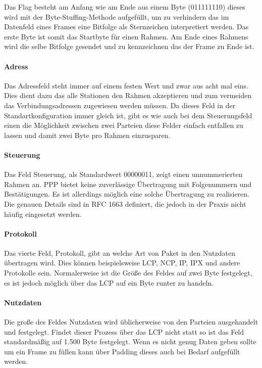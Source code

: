 \documentclass[12pt, a4paper, ngerman]{article}
\begin{document}
Das Flag besteht am Anfang wie am Ende aus einem Byte (011111110) dieses wird mit der Byte-Stuffing-Methode aufgefüllt, um zu verhindern das im Datenfeld eines Frames eine Bitfolge als Sternzeichen interpretiert werden. Das erste Byte ist somit das Startbyte für einen Rahmen. Am Ende eines Rahmens wird die selbe Bitfolge gesendet und zu kennzeichnen das der Frame zu Ende ist.


\paragraph{Adress}

Das Adressfeld steht immer auf einem festen Wert und zwar aus acht mal eins. Dies dient dazu das alle Stationen den Rahmen akzeptieren und zum vermeiden das Verbindungsadressen zugewiesen werden müssen. Da dieses Feld in der Standartkonfiguration immer gleich ist, gibt es wie auch bei dem Steuerungsfeld einen die Möglichkeit zwischen zwei Parteien diese Felder einfach entfallen zu lassen und damit zwei Byte pro Rahmen einzusparen.


\paragraph{Steuerung}

Das Feld Steuerung, als Standardwert 00000011, zeigt einen unnummerierten Rahmen an. PPP bietet keine zuverlässige Übertragung mit Folgenummern und Bestätigungen. Es ist allerdings möglich eine solche Übertragung zu realisieren. Die genauen Details sind in RFC 1663 definiert, die jedoch in der Praxis nicht häufig eingesetzt werden.


\paragraph{Protokoll}

Das vierte Feld, Protokoll, gibt an welche Art von Paket in den Nutzdaten übertragen wird. Dies können beispielsweise LCP, NCP, IP, IPX und andere Protokolle sein. Normalerweise ist die Größe des Feldes auf zwei Byte festgelegt, es ist jedoch möglich über das LCP auf ein Byte runter zu handeln.


\paragraph{Nutzdaten}

Die große des Feldes Nutzdaten wird üblicherweise von den Parteien ausgehandelt und festgelegt. Findet dieser Prozess über das LCP nicht statt so ist das Feld standardmäßig auf 1.500 Byte festgelegt.
Wenn es nicht genug Daten geben sollte um ein Frame zu füllen kann über Padding dieses auch bei Bedarf aufgefüllt werden.
\end{document}
